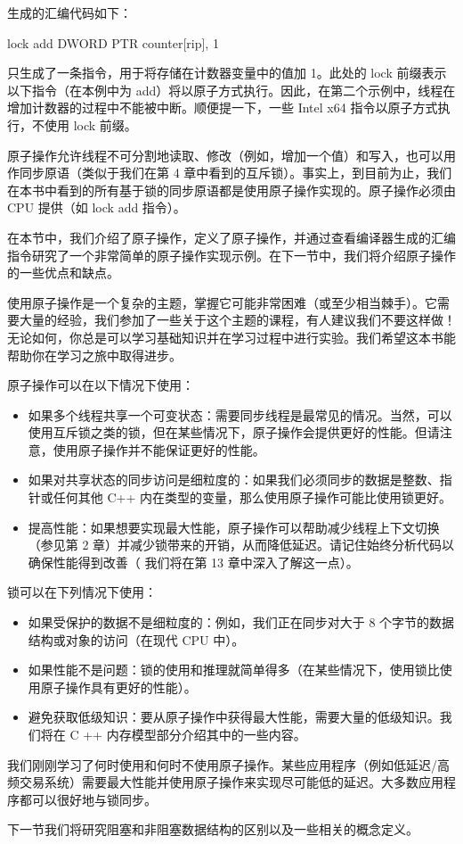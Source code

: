 生成的汇编代码如下：

\begin{cpp}
lock add DWORD PTR counter[rip], 1
\end{cpp}

只生成了一条指令，用于将存储在计数器变量中的值加 1。此处的 lock 前缀表示以下指令（在本例中为 add）将以原子方式执行。因此，在第二个示例中，线程在增加计数器的过程中不能被中断。顺便提一下，一些 Intel x64 指令以原子方式执行，不使用 lock 前缀。

原子操作允许线程不可分割地读取、修改（例如，增加一个值）和写入，也可以用作同步原语（类似于我们在第 4 章中看到的互斥锁）。事实上，到目前为止，我们在本书中看到的所有基于锁的同步原语都是使用原子操作实现的。原子操作必须由 CPU 提供（如 lock add 指令）。

在本节中，我们介绍了原子操作，定义了原子操作，并通过查看编译器生成的汇编指令研究了一个非常简单的原子操作实现示例。在下一节中，我们将介绍原子操作的一些优点和缺点。


使用原子操作是一个复杂的主题，掌握它可能非常困难（或至少相当棘手）。它需要大量的经验，我们参加了一些关于这个主题的课程，有人建议我们不要这样做！无论如何，你总是可以学习基础知识并在学习过程中进行实验。我们希望这本书能帮助你在学习之旅中取得进步。

原子操作可以在以下情况下使用：

\begin{itemize}
\item
如果多个线程共享一个可变状态：需要同步线程是最常见的情况。当然，可以使用互斥锁之类的锁，但在某些情况下，原子操作会提供更好的性能。但请注意，使用原子操作并不能保证更好的性能。

\item
如果对共享状态的同步访问是细粒度的：如果我们必须同步的数据是整数、指针或任何其他 C++ 内在类型的变量，那么使用原子操作可能比使用锁更好。

\item
提高性能：如果想要实现最大性能，原子操作可以帮助减少线程上下文切换（参见第 2 章）并减少锁带来的开销，从而降低延迟。请记住始终分析代码以确保性能得到改善（ 我们将在第 13 章中深入了解这一点）。
\end{itemize}

锁可以在下列情况下使用：

\begin{itemize}
\item
如果受保护的数据不是细粒度的：例如，我们正在同步对大于 8 个字节的数据结构或对象的访问（在现代 CPU 中）。

\item
如果性能不是问题：锁的使用和推理就简单得多（在某些情况下，使用锁比使用原子操作具有更好的性能）。

\item
避免获取低级知识：要从原子操作中获得最大性能，需要大量的低级知识。我们将在 C ++ 内存模型部分介绍其中的一些内容。
\end{itemize}

我们刚刚学习了何时使用和何时不使用原子操作。某些应用程序（例如低延迟/高频交易系统）需要最大性能并使用原子操作来实现尽可能低的延迟。大多数应用程序都可以很好地与锁同步。

下一节我们将研究阻塞和非阻塞数据结构的区别以及一些相关的概念定义。







